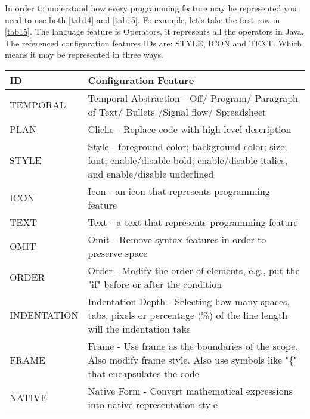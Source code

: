 In order to understand how every programming feature may be represented you need to use both \autoref{tab14} and \autoref{tab15}. Fo example, let's take the first row in \autoref{tab15}. The language feature is Operators, it represents all the operators in Java. The referenced configuration features IDs are: STYLE, ICON and TEXT. Which means it may be represented in three ways.
\begin{table}[H]
\centering
\begin{tabular}{|l|p{14cm}|}
\hline
\textbf{ID}  & \textbf{Configuration Feature}                                                                                            		  \\ \hline
TEMPORAL     & Temporal Abstraction - Off/ Program/ Paragraph of Text/ Bullets /Signal flow/ Spreadsheet                                          \\ \hline
PLAN         & Cliche - Replace code with high-level description                                                                                  \\ \hline
STYLE        & Style - foreground color; background color; size; font; enable/disable bold; enable/disable italics, and enable/disable underlined \\ \hline
ICON         & Icon - an icon that represents programming feature                                                                                 \\ \hline
TEXT         & Text - a text that represents programming feature                                                                                  \\ \hline
OMIT         & Omit - Remove syntax features in-order to preserve space                                                                           \\ \hline
ORDER        & Order - Modify the order of elements, e.g., put the "if" before or after the condition                                             \\ \hline
INDENTATION  & Indentation Depth - Selecting how many spaces, tabs, pixels or percentage (\%) of the line length will the indentation take        \\ \hline
FRAME        & Frame - Use frame as the boundaries of the scope. Also modify frame style. Also use symbols like "\{" that encapsulates the code   \\ \hline
NATIVE       & Native Form - Convert mathematical expressions into native representation style                                                    \\ \hline

\end{tabular}
\end{table}
